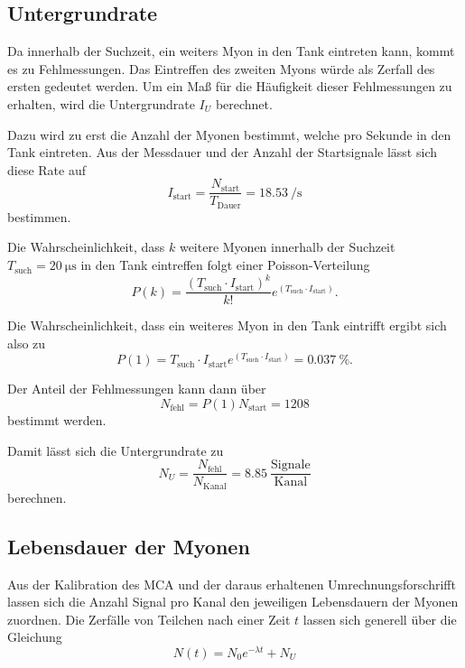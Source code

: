 \subsection{Untergrundrate}

Da innerhalb der Suchzeit, ein weiters Myon in den Tank eintreten kann, kommt es zu Fehlmessungen. Das Eintreffen des zweiten Myons würde als Zerfall des ersten gedeutet werden.  Um ein Maß für die Häufigkeit dieser Fehlmessungen zu erhalten, wird die Untergrundrate $I_U$ berechnet.


Dazu wird zu erst die Anzahl der Myonen bestimmt, welche pro Sekunde in den Tank eintreten. 
Aus der Messdauer und der Anzahl der Startsignale lässt sich diese Rate auf
\begin{equation}
    I_\text{start} = \frac{N_\text{start}}{T_\text{Dauer}} = \SI{18.53}{\per\s}
\end{equation}
bestimmen.

Die Wahrscheinlichkeit, dass $k$ weitere Myonen innerhalb der Suchzeit $T_\text{such} = \SI{20}{\micro\s}$ in den Tank eintreffen folgt einer Poisson-Verteilung 
\begin{equation}
    P(k) = \frac{(T_\text{such} \cdot I_\text{start})^k}{k!} e^{(T_\text{such} \cdot I_\text{start})} .
\end{equation}

Die Wahrscheinlichkeit, dass ein weiteres Myon in den Tank eintrifft ergibt sich also zu 
\begin{equation}
    P(1) = T_\text{such}\cdot I_\text{start} e^{(T_\text{such} \cdot I_\text{start})} = \SI{0.037}{\percent} .
\end{equation}

Der Anteil der Fehlmessungen kann dann über 
\begin{equation}
    N_\text{fehl} = P(1)N_\text{start} = \num{1208}
\end{equation}
bestimmt werden.

Damit lässt sich die Untergrundrate zu 
\begin{equation}
    N_U = \frac{N_\text{fehl}}{N_\text{Kanal}} = \num{8.85} \: \frac{\text{Signale}}{\text{Kanal}}
\end{equation}
berechnen.

\subsection{Lebensdauer der Myonen}

Aus der Kalibration des MCA und der daraus erhaltenen Umrechnungsforschrifft lassen sich die Anzahl Signal pro Kanal den jeweiligen Lebensdauern der Myonen zuordnen. Die Zerfälle von Teilchen nach einer Zeit $t$ lassen sich generell über die Gleichung
\begin{equation}
    N(t) = N_0 e^{-\lambda t} + N_U
\end{equation}

